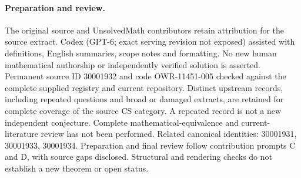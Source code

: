 \documentclass[11pt]{article}
\begin{document}
\paragraph{Preparation and review.}
The original source and UnsolvedMath contributors retain attribution for the source extract. Codex (GPT-6; exact serving revision not exposed) assisted with definitions, English summaries, scope notes and formatting. No new human mathematical authorship or independently verified solution is asserted. Permanent source ID 30001932 and code OWR-11451-005 checked against the complete supplied registry and current repository. Distinct upstream records, including repeated questions and broad or damaged extracts, are retained for complete coverage of the source CS category. A repeated record is not a new independent conjecture. Complete mathematical-equivalence and current-literature review has not been performed. Related canonical identities: 30001931, 30001933, 30001934. Preparation and final review follow contribution prompts C and D, with source gaps disclosed. Structural and rendering checks do not establish a new theorem or open status.
\label{end:30001932}
\end{document}
